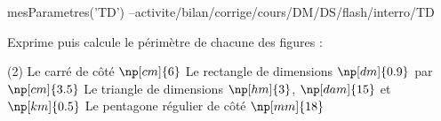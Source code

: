 \documentclass{classe-tex3R}
\begin{document}
\begin{luacode}
	mesParametres('TD') --activite/bilan/corrige/cours/DM/DS/flash/interro/TD
\end{luacode}
\parametrage



\begin{enonce}
	Exprime puis calcule le périmètre de chacune des figures : 

	\begin{tasks}[style=enumerate](2)
		\task Le carré de côté $\np[cm]{6}$
		\task Le rectangle de dimensions $\np[dm]{0.9}$ par $\np[cm]{3.5}$
		\task Le triangle de dimensions $\np[hm]{3}$, $\np[dam]{15}$ et $\np[km]{0.5}$
		\task Le pentagone régulier de côté $\np[mm]{18}$
	\end{tasks}
\end{enonce}



\end{document}
